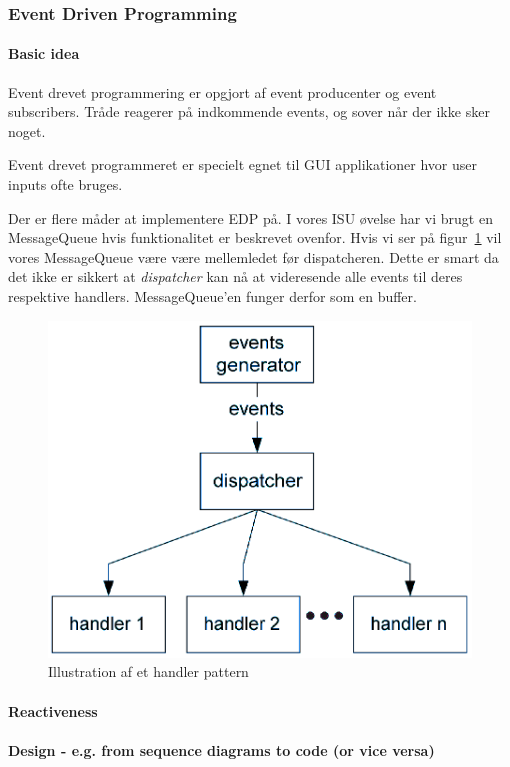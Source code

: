 \subsubsection{Event Driven Programming}

\paragraph{Basic idea}
Event drevet programmering er opgjort af event producenter og event subscribers.
Tråde reagerer på indkommende events, og sover når der ikke sker noget.

Event drevet programmeret er specielt egnet til GUI applikationer hvor user inputs ofte bruges.

Der er flere måder at implementere EDP på. I vores ISU øvelse har vi brugt en MessageQueue hvis funktionalitet er beskrevet ovenfor.
Hvis vi ser på figur~\ref{fig:handlPat} vil vores MessageQueue være være mellemledet før dispatcheren. Dette er smart da det ikke er sikkert at \textit{dispatcher} kan nå at videresende alle events til deres respektive handlers. MessageQueue'en funger derfor som en buffer. 

\begin{figure}[h]
	\centering
	\includegraphics[width=0.6\linewidth]{figs/spm3/handlersPattern}
	\caption{Illustration af et handler pattern}
	\label{fig:handlPat}
\end{figure}

\paragraph{Reactiveness}

\paragraph{Design - e.g. from sequence diagrams to code (or vice versa)}
